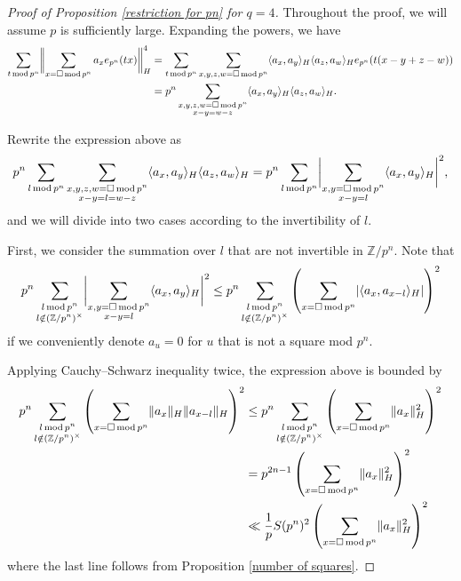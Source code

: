 \documentclass[11pt]{amsart}
\theoremstyle{plain} %
\theoremstyle{remark}
\numberwithin{equation}{section}
\newcommand{\Z}{\mathbb{Z}}
\DeclarePairedDelimiter\abs{\lvert}{\rvert}
\DeclarePairedDelimiter\norm{\lVert}{\rVert}
\newcommand{\sqp}[1]{\sum_{#1=\square\,\mathrm{mod}\,p^n}}
\newcommand{\ap}[1]{\sum_{#1\,\mathrm{mod}\,p^n}}
\begin{document}
\begin{proof}[Proof of Proposition \ref{restriction for pn} for $q=4$]
        Throughout the proof, we will assume $p$ is sufficiently large. Expanding the powers, we have
    \begin{equation*}
    \begin{split}
        \ap{t}\norm[\bigg]{\sqp{x}a_xe_{p^n}(tx)}^4_H&=\ap{t}\sqp{x,y,z,w}\langle a_x,a_y \rangle_H \langle a_z,a_w \rangle_H e_{p^n}(t(x-y+z-w))\\
        &=p^n \sum_{\substack{x,y,z,w=\square\,\mathrm{mod}\,p^n\\x-y=w-z}} \langle a_x,a_y \rangle_H \langle a_z,a_w \rangle_H .
    \end{split}       
    \end{equation*}

    Rewrite the expression above as
    \begin{equation*}
        p^n \ap{l}\sum_{\substack{x,y,z,w=\square\,\mathrm{mod}\,p^n\\x-y=l=w-z}} \langle a_x,a_y \rangle_H \langle a_z,a_w \rangle_H=p^n \ap{l}\abs[\bigg]{\sum_{\substack{x,y=\square\,\mathrm{mod}\,p^n\\x-y=l}} \langle a_x,a_y \rangle_H}^2 ,
    \end{equation*}
    and we will divide into two cases according to the invertibility of $l$.

    First, we consider the summation over $l$ that are not invertible in $\Z/p^n$. Note that
    \begin{equation*}
        p^n \sum_{\substack{l\,\mathrm{mod}\,p^n\\l\notin (\Z/p^n)^{\times}}}\abs[\bigg]{\sum_{\substack{x,y=\square\,\mathrm{mod}\,p^n\\x-y=l}} \langle a_x,a_y \rangle_H}^2 \leq p^n \sum_{\substack{l\,\mathrm{mod}\,p^n\\l\notin (\Z/p^n)^{\times}}}\left(\sqp{x} \abs{\langle a_x,a_{x-l} \rangle_H}\right)^2
    \end{equation*}
    if we conveniently denote $a_u=0$ for $u$ that is not a square mod $p^n$.

    Applying Cauchy--Schwarz inequality twice, the expression above is bounded by
    \begin{equation}\label{eqs: q is four 1}
        \begin{split}
            p^n \sum_{\substack{l\,\mathrm{mod}\,p^n\\l\notin (\Z/p^n)^{\times}}}\left(\sqp{x} \norm{a_x}_H \norm{a_{x-l}}_H\right)^2
            &\leq p^n \sum_{\substack{l\,\mathrm{mod}\,p^n\\l\notin (\Z/p^n)^{\times}}}\left(\sqp{x} \norm{a_x}_H^2\right)^2\\
            &=p^{2n-1}\left(\sqp{x} \norm{a_x}_H^2\right)^2\\
            &\ll \frac{1}{p}S(p^n)^2\left(\sqp{x} \norm{a_x}_H^2\right)^2
        \end{split}
    \end{equation}
    where the last line follows from Proposition \ref{number of squares}.


\end{proof}
\end{document}
